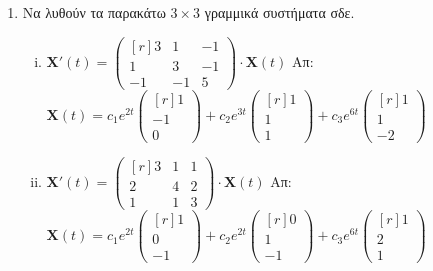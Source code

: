 \begin{enumerate}
  \item Να λυθούν τα παρακάτω $ 3 \times 3$  γραμμικά συστήματα σδε.

    \begin{enumerate}[i)]
      \item $ \mathbf{X}'(t) = 
        \begin{pmatrix*}[r]
          3 & 1 & -1 \\
          1 & 3 & -1 \\
          -1 & -1 & 5
        \end{pmatrix*} \cdot 
        \mathbf{X}(t) $
        \hfill Απ: {\scriptsize $ \mathbf{X}(t) = c_{1}e^{2t} 
          \begin{pmatrix*}[r] 1 \\ -1 \\ 0 \end{pmatrix*} + c_{2}e^{3t} 
          \begin{pmatrix*}[r] 1 \\ 1 \\ 1 \end{pmatrix*} + c_{3} e^{6t}
        \begin{pmatrix*}[r] 1 \\ 1 \\ -2 \end{pmatrix*}$ }

      \item $ \mathbf{X}'(t) = 
        \begin{pmatrix*}[r]
          3 & 1 & 1 \\
          2 & 4 & 2 \\
          1 & 1 & 3
        \end{pmatrix*} \cdot 
        \mathbf{X}(t)$
        \hfill Απ: {\scriptsize $ \mathbf{X}(t)=c_{1}e^{2t} 
          \begin{pmatrix*}[r] 1 \\ 0 \\ -1 \end{pmatrix*} + c_{2}e^{2t} 
          \begin{pmatrix*}[r] 0 \\ 1 \\ -1 \end{pmatrix*} + c_{3}e^{6t} 
        \begin{pmatrix*}[r] 1 \\ 2 \\ 1 \end{pmatrix*}$ }


\end{enumerate}
\end{enumerate}
